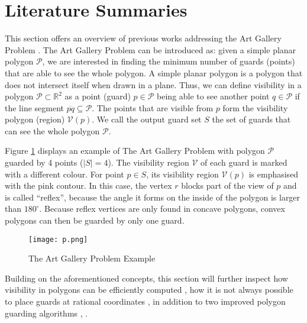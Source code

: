 \section{Literature Summaries}
This section offers an overview of previous works addressing the Art Gallery Problem \cite{o1987art}. The Art Gallery Problem \cite{o1987art} can be introduced as: given a simple planar polygon $\mathcal P$, we are interested in finding the minimum number of guards (points) that are able to see the whole polygon. A simple planar polygon is a polygon that does not intersect itself when drawn in a plane. Thus, we can define visibility in a polygon $\mathcal P \subset \mathbb R^2$ as a point (guard) $p \in \mathcal P$ being able to see another point $q \in \mathcal P$ if the line segment $\overline{pq} \subseteq \mathcal P$. The points that are visible from $p$ form the visibility polygon (region) $\mathcal V(p)$. We call the output guard set $S$ the set of guards that can see the whole polygon $\mathcal P$.

Figure \ref{fig:art} displays an example of The Art Gallery Problem \cite{o1987art} with polygon $\mathcal P$ guarded by 4 points ($|S| = 4$). The visibility region $\mathcal V$ of each guard is marked with a different colour. For point $p \in S$, its visibility region $\mathcal V(p)$ is emphasised with the pink contour. In this case, the vertex $r$ blocks part of the view of $p$ and is called ``reflex'', because the angle it forms on the inside of the polygon is larger than $180^\circ$. Because reflex vertices are only found in concave polygons, convex polygons can then be guarded by only one guard.

\begin{figure}[h!]
    \centering
    \texttt{[image: p.png]}
    \caption{The Art Gallery Problem \cite{o1987art} Example}
    \label{fig:art}
\end{figure}
Building on the aforementioned concepts, this section will further inspect how visibility in polygons can be efficiently computed \cite{DBLP:journals/corr/BungiuHHHK14}, how it is not always possible to place guards at rational coordinates \cite{abrahamsen2021art}, in addition to two improved polygon guarding algorithms \cite{maleki2022implementation}, \cite{DBLP:journals/corr/abs-2007-06920}.





\newpage

